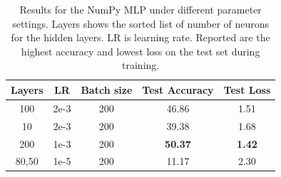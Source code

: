 \documentclass{article}
\newcommand\·{\ensuremath{\cdot}}
\newcommand\…{\ensuremath{\dots}}
\newcommand{\⇔}{\ensuremath{\Leftrightarrow}}
\newcommand{\⇐}{\ensuremath{\Rightarrow}}
\newcommand{\⇒}{\ensuremath{\Leftarrow}}
\newcommand\1{\ensuremath{\mathds{1}}}
\newcommand\ℝ{\ensuremath{\mathds{R}}}
\begin{document}
\begin{table}
  \centering
  \begin{tabular}{ccccc}
    Layers & LR & Batch size & Test Accuracy & Test Loss\\\toprule
    100 & 2e-3 & 200 & 46.86 & 1.51\\
    10 & 2e-3 & 200 & 39.38 & 1.68\\
    200 & 1e-3 & 200 & \textbf{50.37} & \textbf{1.42}\\
    80,50 & 1e-5 & 200 & 11.17 & 2.30\\
  \end{tabular}
  \caption{Results for the NumPy MLP under different parameter settings. Layers shows the sorted list of number of neurons for the hidden layers. LR is learning rate. Reported are the highest accuracy and lowest loss on the test set during training.}
  \label{tab:numpy}
\end{table}
\end{document}

